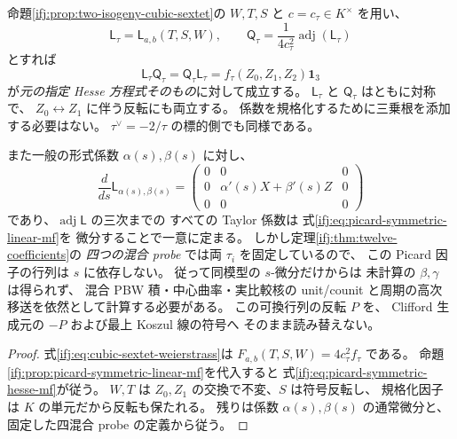 \begin{corollary}
\label{ifj:cor:picard-symmetric-hesse-family}
命題\ref{ifj:prop:two-isogeny-cubic-sextet}の
$W,T,S$ と $c=c_\tau\in K^\times$ を用い、
\[
 \mathsf L_\tau
  =\mathsf L_{a,b}(T,S,W),\qquad
 \mathsf Q_\tau
  =\frac1{4c_\tau^2}
          \operatorname{adj}(\mathsf L_\tau)
\]
とすれば
\begin{equation}\label{ifj:eq:picard-symmetric-hesse-mf}
 \mathsf L_\tau\mathsf Q_\tau
 =\mathsf Q_\tau\mathsf L_\tau
 =f_\tau(Z_0,Z_1,Z_2)\mathbf1_3
\end{equation}
が\emph{元の指定 Hesse 方程式そのもの}に対して成立する。
$\mathsf L_\tau$ と $\mathsf Q_\tau$ はともに対称で、
$Z_0\leftrightarrow Z_1$ に伴う反転にも両立する。
係数を規格化するために三乗根を添加する必要はない。
$\tau^\vee=-2/\tau$ の標的側でも同様である。

また一般の形式係数 $\alpha(s),\beta(s)$ に対し、
\[
 \frac{d}{ds}\mathsf L_{\alpha(s),\beta(s)}
 =\begin{pmatrix}
 0&0&0\\
 0&\alpha'(s)X+\beta'(s)Z&0\\
 0&0&0
 \end{pmatrix}
\]
であり、$\operatorname{adj}\mathsf L$ の三次までの
すべての Taylor 係数は
式\eqref{ifj:eq:picard-symmetric-linear-mf}を
微分することで一意に定まる。
しかし定理\ref{ifj:thm:twelve-coefficients}の
\emph{四つの混合 probe} では両 $\tau_i$ を固定しているので、
この Picard 因子の行列は $s$ に依存しない。
従って同模型の $s$-微分だけからは
未計算の $\beta,\gamma$ は得られず、
混合 PBW 積・中心曲率・実比較核の
unit/counit と周期の高次移送を依然として計算する必要がある。
この可換行列の反転 $P$ を、
Clifford 生成元の $-P$ および最上 Koszul 線の符号へ
そのまま読み替えない。
\end{corollary}

\begin{proof}
式\eqref{ifj:eq:cubic-sextet-weierstrass}は
$F_{a,b}(T,S,W)=4c_\tau^2f_\tau$ である。
命題\ref{ifj:prop:picard-symmetric-linear-mf}を代入すると
式\eqref{ifj:eq:picard-symmetric-hesse-mf}が従う。
$W,T$ は $Z_0,Z_1$ の交換で不変、$S$ は符号反転し、
規格化因子は $K$ の単元だから反転も保たれる。
残りは係数 $\alpha(s),\beta(s)$ の通常微分と、
固定した四混合 probe の定義から従う。
\end{proof}

